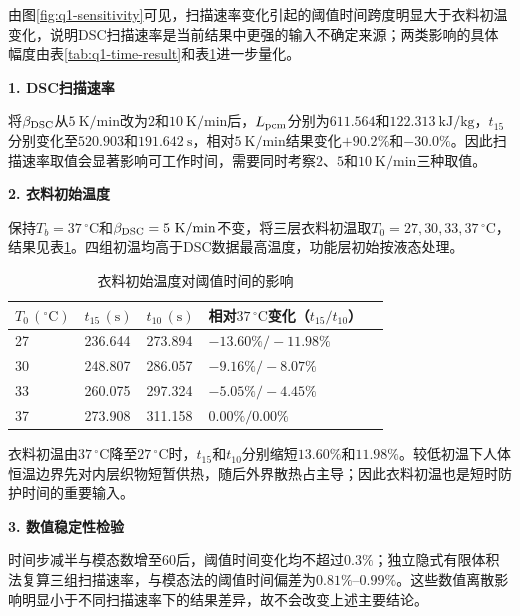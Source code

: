 由图\ref{fig:q1-sensitivity}可见，扫描速率变化引起的阈值时间跨度明显大于衣料初温变化，说明DSC扫描速率是当前结果中更强的输入不确定来源；两类影响的具体幅度由表\ref{tab:q1-time-result}和表\ref{tab:q1-initial-temperature}进一步量化。
\FloatBarrier

\noindent\textbf{1. DSC扫描速率}\par

将$\beta_{\rm DSC}$从$5\ \mathrm{K/min}$改为$2$和$10\ \mathrm{K/min}$后，$L_{\rm pcm}$分别为$611.564$和$122.313\ \mathrm{kJ/kg}$，$t_{15}$分别变化至$520.903$和$191.642\ \mathrm s$，相对$5\ \mathrm{K/min}$结果变化$+90.2\%$和$-30.0\%$。因此扫描速率取值会显著影响可工作时间，需要同时考察$2$、$5$和$10\ \mathrm{K/min}$三种取值。

\noindent\textbf{2. 衣料初始温度}\par

保持$T_b=37\,^{\circ}\mathrm C$和$\beta_{\rm DSC}=5\ \mathrm{K/min}$不变，将三层衣料初温取$T_0=27,30,33,37\,^{\circ}\mathrm C$，结果见表\ref{tab:q1-initial-temperature}。四组初温均高于DSC数据最高温度，功能层初始按液态处理。

\begin{table}[!htbp]
\centering
\caption{衣料初始温度对阈值时间的影响}
\label{tab:q1-initial-temperature}
\begingroup
{}
\begin{tabularx}{\textwidth}{XXXXX}  %
\toprule
\rowcolor{cyan!50!blue!30}
$T_0\,(^{\circ}\mathrm C)$ & $t_{15}\,(\mathrm{s})$ & $t_{10}\,(\mathrm{s})$ & 相对$37\,^{\circ}\mathrm C$变化（$t_{15}/t_{10}$） \\
\midrule
27 & 236.644 & 273.894 & $-13.60\%/-11.98\%$ \\
30 & 248.807 & 286.057 & $-9.16\%/-8.07\%$ \\
33 & 260.075 & 297.324 & $-5.05\%/-4.45\%$ \\
37 & 273.908 & 311.158 & $0.00\%/0.00\%$ \\
\bottomrule
\end{tabularx}
\endgroup
\end{table}

衣料初温由$37\,^{\circ}\mathrm C$降至$27\,^{\circ}\mathrm C$时，$t_{15}$和$t_{10}$分别缩短$13.60\%$和$11.98\%$。较低初温下人体恒温边界先对内层织物短暂供热，随后外界散热占主导；因此衣料初温也是短时防护时间的重要输入。

\noindent\textbf{3. 数值稳定性检验}\par

时间步减半与模态数增至$60$后，阈值时间变化均不超过$0.3\%$；独立隐式有限体积法复算三组扫描速率，与模态法的阈值时间偏差为$0.81\%$--$0.99\%$。这些数值离散影响明显小于不同扫描速率下的结果差异，故不会改变上述主要结论。